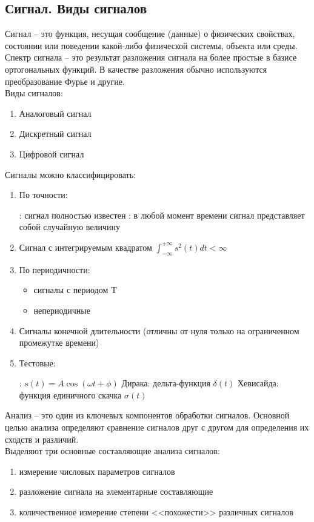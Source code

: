 \documentclass[a4paper]{article}
\begin{document}
\subsection{Сигнал. Виды сигналов}
Сигнал -- это функция, несущая сообщение (данные) о физических свойствах, состоянии или поведении какой-либо физической системы, объекта или среды.\\
Спектр сигнала -- это результат разложения сигнала на более простые в базисе ортогональных функций. В качестве разложения обычно используются преобразование Фурье и другие.\\
Виды сигналов:
\begin{enumerate}
    \item Аналоговый сигнал
    \item Дискретный сигнал
    \item Цифровой сигнал
\end{enumerate}
Сигналы можно классифицировать:
\begin{enumerate}
    \item По точности:
    \begin{itemize}
        : сигнал полностью известен
        : в любой момент времени сигнал представляет собой случайную величину
    \end{itemize}
    \item Сигнал с интегрируемым квадратом $\int_{-\infty}^{+\infty}s^2(t)dt<\infty$
    \item По периодичности:
    \begin{itemize}
        \item сигналы с периодом T
        \item непериодичные
    \end{itemize}
    \item Сигналы конечной длительности (отличны от нуля только на ограниченном промежутке времени)
    \item Тестовые:
    \begin{itemize}
    : $s(t)=A\cos{(\omega t+ \phi)}$
     Дирака: дельта-функция $\delta(t)$
     Хевисайда: функция единичного скачка $\sigma(t)$
    \end{itemize}
\end{enumerate}
Анализ -- это один из ключевых компонентов обработки сигналов. Основной целью анализа определяют сравнение сигналов друг с другом для определения их сходств и различий. \\
Выделяют три основные составляющие анализа сигналов:
\begin{enumerate}
    \item измерение числовых параметров сигналов
    \item разложение сигнала на элементарные составляющие
    \item количественное измерение степени <<похожести>> различных сигналов
\end{enumerate}
\end{document}
